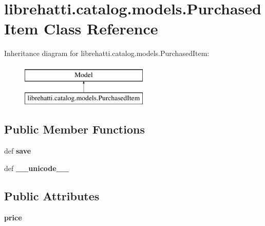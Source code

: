 \hypertarget{classlibrehatti_1_1catalog_1_1models_1_1PurchasedItem}{\section{librehatti.\-catalog.\-models.\-Purchased\-Item Class Reference}
\label{classlibrehatti_1_1catalog_1_1models_1_1PurchasedItem}
}
Inheritance diagram for librehatti.\-catalog.\-models.\-Purchased\-Item\-:\begin{figure}[H]
\begin{center}
\leavevmode
\includegraphics[height=2.000000cm]{classlibrehatti_1_1catalog_1_1models_1_1PurchasedItem}
\end{center}
\end{figure}
\subsection*{Public Member Functions}
\begin{DoxyCompactItemize}
\item 
\hypertarget{classlibrehatti_1_1catalog_1_1models_1_1PurchasedItem_a166fc847aabefa7daf910abd24d2d3af}{def {\bfseries save}}\label{classlibrehatti_1_1catalog_1_1models_1_1PurchasedItem_a166fc847aabefa7daf910abd24d2d3af}

\item 
\hypertarget{classlibrehatti_1_1catalog_1_1models_1_1PurchasedItem_abf536261b59c1b8c155619f960e179fd}{def {\bfseries \-\_\-\-\_\-unicode\-\_\-\-\_\-}}\label{classlibrehatti_1_1catalog_1_1models_1_1PurchasedItem_abf536261b59c1b8c155619f960e179fd}

\end{DoxyCompactItemize}
\subsection*{Public Attributes}
\begin{DoxyCompactItemize}
\item 
\hypertarget{classlibrehatti_1_1catalog_1_1models_1_1PurchasedItem_a4501d413b89ac16cc15225cd8aa63045}{{\bfseries price}}\label{classlibrehatti_1_1catalog_1_1models_1_1PurchasedItem_a4501d413b89ac16cc15225cd8aa63045}

\end{DoxyCompactItemize}
